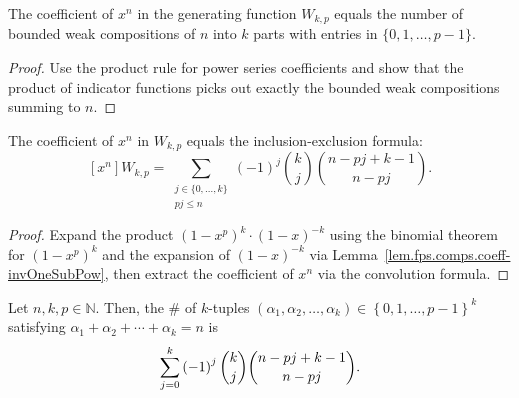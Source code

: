\begin{lemma}
\label{lem.fps.comps.coeff-genFun}
\leanhelper
\leanok
The coefficient of $x^n$ in the generating function $W_{k,p}$ equals the number of
bounded weak compositions of $n$ into $k$ parts with entries in $\{0, 1, \ldots, p-1\}$.
\end{lemma}

\begin{proof}
\leanok
Use the product rule for power series coefficients
and show that the product of indicator functions picks out exactly the bounded
weak compositions summing to $n$.
\end{proof}

\begin{lemma}
\label{lem.fps.comps.coeff-genFun-formula}
\leanhelper
\leanok
The coefficient of $x^n$ in $W_{k,p}$ equals the inclusion-exclusion formula:
\[
[x^n] W_{k,p} = \sum_{\substack{j \in \{0,\ldots,k\} \\ pj \leq n}}
(-1)^j \binom{k}{j} \binom{n - pj + k - 1}{n - pj}.
\]
\end{lemma}

\begin{proof}
Expand the product $(1-x^p)^k \cdot (1-x)^{-k}$ using the binomial theorem for
$(1-x^p)^k$ and the expansion of $(1-x)^{-k}$ via
Lemma~\ref{lem.fps.comps.coeff-invOneSubPow},
then extract the coefficient of $x^n$ via the convolution formula.
\end{proof}

\begin{theorem}
\label{thm.fps.comps.num-wpcomps-n-k}
\leantarget
\leanok
Let $n,k,p\in\mathbb{N}$. Then, the \# of
$k$-tuples $\left(  \alpha_{1},\alpha_{2},\ldots,\alpha_{k}\right)
\in\left\{  0,1,\ldots,p-1\right\}  ^{k}$ satisfying $\alpha_{1}+\alpha
_{2}+\cdots+\alpha_{k}=n$ is%
\[
\sum_{j=0}^{k}\left(  -1\right)  ^{j}\dbinom{k}{j}\dbinom{n-pj+k-1}{n-pj}.
\]
\end{theorem}

